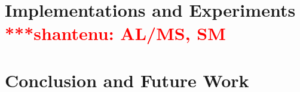 \documentclass[conference,final]{IEEEtran}
\newcommand{\jhanote}[1]{ {\textcolor{red} { ***shantenu: #1 }}}
\newcommand{\jhanote}[1]{}
\begin{document}
\section{Implementations and Experiments \jhanote{AL/MS, SM}}


\section{Conclusion and Future Work}





\end{document}

